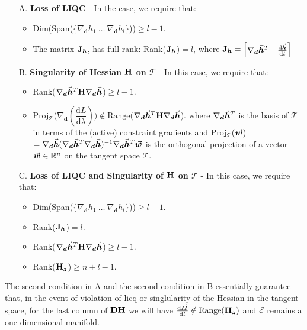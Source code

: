\begin{enumerate}
	\item[A.] \textbf{Loss of LIQC} - In the case, we require that:
	\begin{itemize}
		\item Dim(Span($\{\nabla_{\bm{d}}h_1\ \dots\
		\nabla_{\bm{d}}h_l\}$))$\geq l-1$.
		\item The matrix $\mathbf{J}_{\bm{h}}$, has full rank:
		Rank($\mathbf{J}_{\bm{h}}$)$=l$, where $\mathbf{J}_{\bm{h}}=\begin{bmatrix}
			\nabla_{\bm{d}}\vec{\bm{h}}^T & \frac{\text{d}\vec{\bm{h}}}{\text{d}t}
		\end{bmatrix}$
	\end{itemize}
	\item[B.] \textbf{Singularity of Hessian $\mathbf{H}$ on $\mathcal{T}$} - In 
	this case, we require that:
	\begin{itemize}
		\item 
		Rank($\nabla_{\bm{d}}\vec{\bm{h}}^T\mathbf{H}\nabla_{\bm{d}}\vec{\bm{h}}$)$\geq 
		l-1$.
		\item
		Proj$_{\mathcal{T}}$($\nabla_{\bm{d}}(\dfrac{\text{d}L}{\text{d}\lambda}))
		\notin\text{Range}($$\nabla_{\bm{d}}\vec{\bm{h}}^T\mathbf{H}\nabla_{\bm{d}}\vec{\bm{h}}$).\newline
		where $\nabla_{\bm{d}}\vec{\bm{h}}^T$ is the basis of $\mathcal{T}$ in 
		terms of the (active) constraint gradients and
		Proj$_{\mathcal{T}}$($\vec{\bm{w}}$)$ =
		\nabla_{\bm{d}}\vec{\bm{h}}(\nabla_{\bm{d}}\vec{\bm{h}}^T
		\nabla_{\bm{d}}\vec{\bm{h}})^{-1}\nabla_{\bm{d}}\vec{\bm{h}}^T\vec{\bm{w}}$ is 
		the orthogonal projection
		of a vector $\vec{\bm{w}}\in\mathbb{R}^n$ on the tangent space
		$\mathcal{T}$.
	\end{itemize}
	\item[C.] \textbf{Loss of LIQC and Singularity of $\mathbf{H}$ on 
	$\mathcal{T}$} - In this case, we require that:
	\begin{itemize}
		\item  Dim(Span($\{\nabla_{\bm{d}}h_1\ \dots\
		\nabla_{\bm{d}}h_l\}$))$\geq l-1$.
		\item Rank($\mathbf{J}_{\bm{h}}$)$=l$.
		\item 
		Rank($\nabla_{\bm{d}}\vec{\bm{h}}^T\mathbf{H}\nabla_{\bm{d}}\vec{\bm{h}}$)$\geq 
		l-1$.
		\item Rank($\mathbf{H}_{\bm{z}}$)$\geq n+l-1$.
	\end{itemize}
\end{enumerate}
The second condition in A and the second condition in B essentially guarantee
that, in the event of violation of \acrshort{licq} or singlularity of the 
Hessian in the tangent space, for the last column of $\mathbf{DH}$ we will have  
$\frac{\text{d}\vec{\bm{H}}}{\text{d}t}\notin\text{Range}(\mathbf{H}_{\bm{z}})$
and $\mathcal{E}$ remains a one-dimensional manifold. 

